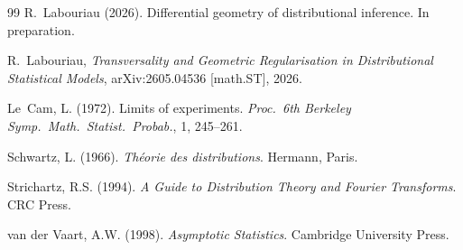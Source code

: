 \documentclass[11pt,a4paper]{article}
\begin{document}
\begin{thebibliography}{99}
R.~Labouriau (2026).
Differential geometry of distributional inference.
In preparation.

R.~Labouriau,
\emph{Transversality and Geometric Regularisation in Distributional
  Statistical Models},
  arXiv:2605.04536 [math.ST], 2026.

Le~Cam, L. (1972).
Limits of experiments.
\emph{Proc.\ 6th Berkeley Symp.\ Math.\ Statist.\ Probab.}, 1, 245--261.

Schwartz, L. (1966).
\emph{Th\'eorie des distributions}.
Hermann, Paris.

Strichartz, R.S. (1994).
\emph{A Guide to Distribution Theory and Fourier Transforms}.
CRC Press.

van der Vaart, A.W. (1998).
\emph{Asymptotic Statistics}.
Cambridge University Press.

\end{thebibliography}
\end{document}
